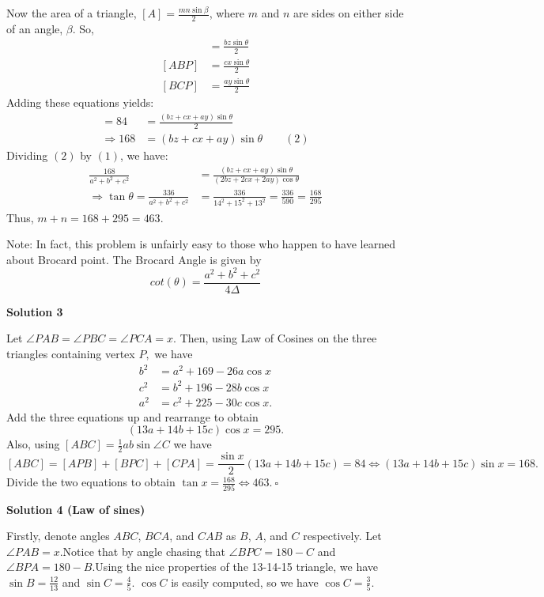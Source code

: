 \begin{enumerate}
 Now the area of a triangle, $[A] = \frac {mn\sin{\beta}}{2}$, where $m$ and $n$ are sides on either side of an angle, $\beta$. So, 
 \begin{align*}[CAP] &= \frac {bz\sin{\theta}}{2}\\ [ABP] &= \frac {cx\sin{\theta}}{2}\\ [BCP] &= \frac {ay\sin{\theta}}{2}\end{align*}
Adding these equations yields:
 \begin{align*}[ABC]= 84 &= \frac {(bz + cx + ay)\sin{\theta}}{2}\\ \Rightarrow 168&= (bz + cx + ay)\sin{\theta}\qquad (2)\end{align*}
Dividing $(2)$ by $(1)$, we have:
 \begin{align*}\frac {168}{a^2 + b^2 + c^2} &= \frac {(bz + cx + ay)\sin{\theta}}{(2bz + 2cx + 2ay)\cos{\theta}}\\ \Rightarrow \tan{\theta} = \frac {336}{a^2 + b^2 + c^2} &= \frac {336}{14^2 + 15^2 + 13^2} = \frac {336}{590} = \frac {168}{295}\end{align*}
Thus, $m + n = 168 + 295 = \boxed{463}$.

 Note: In fact, this problem is unfairly easy to those who happen to have learned about Brocard point. The Brocard Angle is given by
 \[cot(\theta)=\frac{a^2+b^2+c^2}{4\Delta}\]




\textbf{Solution 3}

Let $\angle{PAB} = \angle{PBC} = \angle{PCA} = x.$ Then, using Law of Cosines on the three triangles containing vertex $P,$ we have
 \begin{align*} b^2 &= a^2 + 169 - 26a \cos x \\ c^2 &= b^2 + 196 - 28b \cos x \\ a^2 &= c^2 + 225 - 30c \cos x. \end{align*}
Add the three equations up and rearrange to obtain 
 \[(13a + 14b + 15c) \cos x = 295.\] Also, using $[ABC] = \frac{1}{2}ab \sin \angle C$ we have 
 \[[ABC] = [APB] + [BPC] + [CPA] = \dfrac{\sin x}{2}(13a + 14b + 15c) = 84 \iff (13a + 14b + 15c) \sin x = 168.\] Divide the two equations to obtain $\tan x = \frac{168}{295} \iff \boxed{463}.~\square$




\textbf{Solution 4 (Law of sines)}

Firstly, denote angles $ABC$, $BCA$, and $CAB$ as $B$, $A$, and $C$ respectively. Let $\angle{PAB}=x$.Notice that by angle chasing that $\angle{BPC}=180-C$ and $\angle{BPA}=180-B$.Using the nice properties of the 13-14-15 triangle, we have $\sin B = \frac{12}{13}$ and $\sin C = \frac{4}{5}$. $\cos C$ is easily computed, so we have $\cos C=\frac{3}{5}$.


\end{enumerate}
